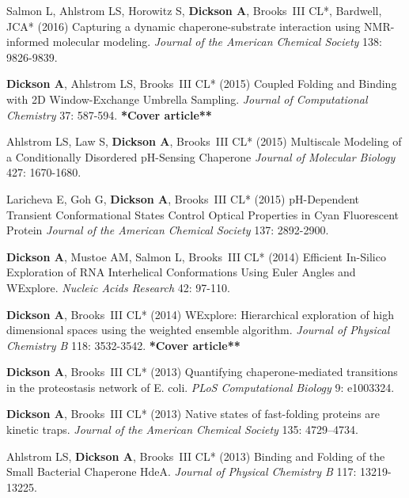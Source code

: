 \documentclass[margin,line]{res}
\begin{document}
\begin{resume}
\begin{spacing}{1.2}
\begin{thebibliography}{10}
\setlength{\itemsep}{0.15in}

Salmon L, Ahlstrom LS, Horowitz S, {\bf Dickson A}, Brooks~{III} CL*, Bardwell, JCA* (2016)
Capturing a dynamic chaperone-substrate interaction using NMR-informed molecular modeling.
\newblock \textit{Journal of the American Chemical Society} 138: 9826-9839.

{\bf Dickson A}, Ahlstrom LS, Brooks~{III} CL* (2015)
Coupled Folding and Binding with 2D Window-Exchange Umbrella Sampling.
\newblock \textit{Journal of Computational Chemistry} 37: 587-594. {\bf **Cover article**}

Ahlstrom LS, Law S, {\bf Dickson A}, Brooks~{III} CL* (2015)
Multiscale Modeling of a Conditionally Disordered {pH}-Sensing Chaperone
\newblock \textit{Journal of Molecular Biology} 427: 1670-1680. 

Laricheva E, Goh G, {\bf Dickson A}, Brooks~{III} CL* (2015)
{pH}-Dependent Transient Conformational States Control Optical Properties in Cyan Fluorescent Protein
\newblock \textit{Journal of the American Chemical Society} 137: 2892-2900. 

{\bf Dickson A}, Mustoe AM, Salmon L, Brooks~{III} CL* (2014)
 Efficient In-Silico Exploration of {RNA} Interhelical Conformations Using Euler Angles and {WE}xplore.
\newblock \textit{Nucleic Acids Research} 42: 97-110.

{\bf Dickson A}, Brooks~{III} CL* (2014) {WE}xplore: Hierarchical
  exploration of high dimensional spaces using the weighted ensemble algorithm.
\newblock \textit{Journal of Physical Chemistry B} 118: 3532-3542. {\bf **Cover article**}

{\bf Dickson A}, Brooks~{III} CL* (2013) Quantifying chaperone-mediated
  transitions in the proteostasis network of {E}. coli.
\newblock \textit{PLoS Computational Biology} 9: e1003324.

{\bf Dickson A}, Brooks~{III} CL* (2013) {Native states of fast-folding proteins are
  kinetic traps.}
\newblock \textit{Journal of the American Chemical Society} 135: 4729--4734.

  Ahlstrom LS, {\bf Dickson A}, Brooks~{III} CL* (2013)
  Binding and Folding of the Small Bacterial Chaperone HdeA.
\newblock \textit{Journal of Physical Chemistry B} 117: 13219-13225.


\end{thebibliography}
\end{spacing}
\end{resume}
\end{document}
